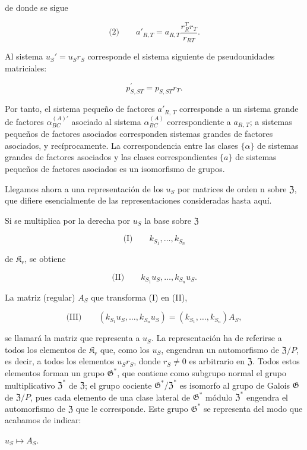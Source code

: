 de donde se sigue

\[
\text{(2)}\qquad a'_{R,T}=a_{R,T}\frac{r_R^T r_T}{r_{RT}}.
\]

Al sistema \(u_S' = u_S r_S\) corresponde el sistema siguiente de pseudounidades matriciales:

\[p_{S,ST}^{\prime}=p_{S,ST}r_{T}.\]

Por tanto, el sistema pequeño de factores \(a'_{R,\,T}\) corresponde a un sistema grande de factores \(\alpha^{(A)\prime}_{BC}\) asociado al sistema \(\alpha^{(A)}_{BC}\) correspondiente a \(a_{R,\,T}\); a sistemas pequeños de factores asociados corresponden sistemas grandes de factores asociados, y recíprocamente. La correspondencia entre las clases \(\{\alpha\}\) de sistemas grandes de factores asociados y las clases correspondientes \(\{a\}\) de sistemas pequeños de factores asociados es un isomorfismo de grupos.

Llegamos ahora a una representación de los \(u_S\) por matrices de orden n sobre \(\mathfrak Z\), que difiere esencialmente de las representaciones consideradas hasta aquí.

Si se multiplica por la derecha por \(u_S\) la base sobre \(\mathfrak Z\)

\[
\text{(I)}\qquad k_{S_1}, \ldots, k_{S_n}
\]

de \(\mathfrak K_r\), se obtiene

\[
\text{(II)}\qquad k_{S_1}u_S, \ldots, k_{S_n}u_S.
\]

La matriz (regular) \(A_S\) que transforma (I) en (II),

\[
\text{(III)}\qquad (k_{S_1}u_S, \ldots, k_{S_n}u_S) = (k_{S_1}, \ldots, k_{S_n})A_S,
\]

se llamará la matriz que representa a \(u_S\). La representación ha de referirse a todos los elementos de \(\mathfrak K_r\) que, como los \(u_S\), engendran un automorfismo de \(\mathfrak Z/P\), es decir, a todos los elementos \(u_Sr_S\), donde \(r_S \neq 0\) es arbitrario en \(\mathfrak Z\). Todos estos elementos forman un grupo \(\mathfrak G^*\), que contiene como subgrupo normal el grupo multiplicativo \(\mathfrak Z^*\) de \(\mathfrak Z\); el grupo cociente \(\mathfrak G^*/\mathfrak Z^*\) es isomorfo al grupo de Galois \(\mathfrak G\) de \(\mathfrak Z/P\), pues cada elemento de una clase lateral de \(\mathfrak G^*\) módulo \(\mathfrak Z^*\) engendra el automorfismo de \(\mathfrak Z\) que le corresponde. Este grupo \(\mathfrak G^*\) se representa del modo que acabamos de indicar:

\(u_S \mapsto A_S\).

